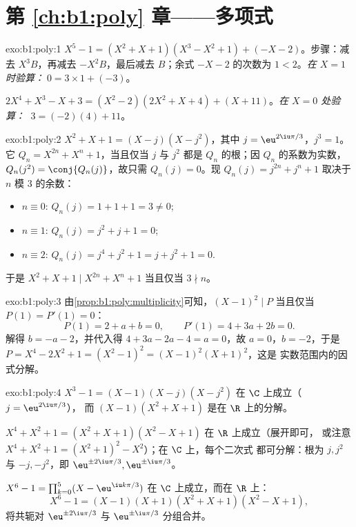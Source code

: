 \section*{第 \ref{ch:b1:poly} 章——多项式}

\begin{solution}{exo:b1:poly:1}
$X^5 - 1 = (X^2 + X + 1)(X^3 - X^2 + 1) + (-X - 2)$。步骤：减去
$X^3 B$，再减去 $-X^2 B$，最后减去 $B$；余式 $-X - 2$ 的次数为
$1 < 2$。\emph{在 $X = 1$ 时验算：}$\;0 = 3 \times 1 + (-3)$。

$2X^4 + X^3 - X + 3 = (X^2 - 2)(2X^2 + X + 4) + (X + 11)$。\emph{在
$X = 0$ 处验算：} $\;3 = (-2)(4) + 11$。
\end{solution}

\begin{solution}{exo:b1:poly:2}
$X^2 + X + 1 = (X - j)(X - j^2)$，其中 $j = \eu^{2\iu\pi/3}$，$j^3 =
1$。它 $Q_n = X^{2n} + X^n + 1$，当且仅当 $j$ 与 $j^2$ 都是
$Q_n$ 的根；因 $Q_n$ 的系数为实数，$Q_n(j^2) =
\conj{Q_n(j)}$，故只需 $Q_n(j) = 0$。现 $Q_n(j) =
j^{2n} + j^n + 1$ 取决于 $n$ 模 $3$ 的余数：
\begin{itemize}
  \item $n \equiv 0$: $Q_n(j) = 1 + 1 + 1 = 3 \neq 0$;
  \item $n \equiv 1$: $Q_n(j) = j^2 + j + 1 = 0$;
  \item $n \equiv 2$: $Q_n(j) = j^4 + j^2 + 1 = j + j^2 + 1 = 0$.
\end{itemize}
于是 $X^2 + X + 1 \mid X^{2n} + X^n + 1$ 当且仅当 $3 \nmid n$。
\end{solution}

\begin{solution}{exo:b1:poly:3}
由\cref{prop:b1:poly:multiplicity}可知，$(X-1)^2 \mid P$ 当且仅当 $P(1) =
P'(1) = 0$：
\[
P(1) = 2 + a + b = 0, \qquad P'(1) = 4 + 3a + 2b = 0 .
\]
解得 $b = -a - 2$，并代入得 $4 + 3a - 2a - 4 = a = 0$，故 $a = 0$，$b =
-2$，于是 $P = X^4 - 2X^2 + 1 = (X^2 - 1)^2 = (X-1)^2 (X+1)^2$，这是
实数范围内的因式分解。
\end{solution}

\begin{solution}{exo:b1:poly:4}
$X^3 - 1 = (X - 1)(X - j)(X - j^2)$ 在 $\C$ 上成立（$j = \eu^{2\iu\pi/3}$），
而 $(X - 1)(X^2 + X + 1)$ 是在 $\R$ 上的分解。

$X^4 + X^2 + 1 = (X^2 + X + 1)(X^2 - X + 1)$ 在 $\R$ 上成立（展开即可，
或注意 $X^4 + X^2 + 1 = (X^2+1)^2 - X^2$）；在 $\C$ 上，每个二次式
都可分解：根为 $j, j^2$ 与 $-j, -j^2$，即 $\eu^{\pm 2\iu\pi/3},
\eu^{\pm\iu\pi/3}$。

$X^6 - 1 = \prod_{k=0}^{5} (X - \eu^{\iu k\pi/3})$ 在 $\C$ 上成立，而在
$\R$ 上：
\[
X^6 - 1 = (X-1)(X+1)(X^2 + X + 1)(X^2 - X + 1),
\]
将共轭对 $\eu^{\pm 2\iu\pi/3}$ 与 $\eu^{\pm
\iu\pi/3}$ 分组合并。
\end{solution}

